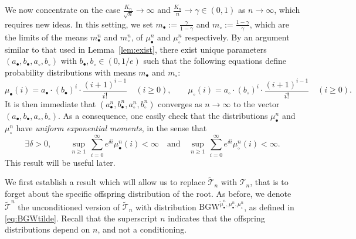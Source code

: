\documentclass[10pt]{amsart}
\theoremstyle{definition}\newtheorem{defi}[theo]{Definition}\newtheorem{rema}[theo]{Remark}\newtheorem{exam}[theo]{Example}\newtheorem{exem}[theo]{Example}\newtheorem{nota}[theo]{Notation}
\def\ab{a_{\bullet}}
\def\ac{a_{\circ}}
\def\bb{b_{\bullet}}
\def\bc{b_{\circ}}
\def\abn{a_{\bullet}^{n}}
\def\acn{a_{\circ}^{n}}
\def\bbn{b_{\bullet}^{n}}
\def\bcn{b_{\circ}^{n}}
\def\mub{\mu_{\bullet}}
\def\muc{\mu_{\circ}}
\def\mubn{\mu_{\bullet}^{n}}
\def\mucn{\mu_{\circ}^{n}}
\def\tTs{\tilde{\Ts}}
\newcommand\BGW{\textrm{BGW}}
\def\Ts{\mathscr{T}}
\begin{document}
We now concentrate on the case  $\tfrac{K_{n}}{\sqrt{n}} \rightarrow \infty$ and $ \tfrac{K_{n}}{n}  \rightarrow \gamma \in (0,1)$ as $n \rightarrow \infty$, which requires new ideas.
In this setting, we set $m_\bullet:=\frac{\gamma}{1-\gamma}$ and $m_\circ:=\frac{1-\gamma}{\gamma}$,
which are the limits of the means $m_\bullet^n$ and $m_\circ^n$, of $\mubn$ and $\mucn$ respectively.
By an argument similar to that used in Lemma~\ref{lem:exist}, there exist unique parameters $(\ab,\bb,\ac,\bc)$ with $\bb,\bc \in (0,1/e)$
such that the following equations define probability distributions with means $m_\bullet$ and $m_\circ$:
 \begin{equation}
 \label{eq:mubc}\mub(i)= \ab \cdot  (\bb)^{i} \cdot \frac{(i+1)^{i-1}}{i!}  \quad (i \geq 0), \qquad \muc(i)= \ac \cdot  (\bc)^{i} \cdot \frac{(i+1)^{i-1}}{i!}  \quad (i \geq 0).
 \end{equation}
 It is then immediate that $(\abn,\bbn,\acn,\bcn)$ converges as $n \rightarrow \infty$ to the vector $(\ab,\bb,\ac,\bc)$.
 As a consequence, one easily check that the distributions $\mubn$ and $\mucn$
 have {\em uniform exponential moments}, in the sense that
 \begin{equation}
   \label{eq:expmoment} \exists \delta>0,\,  \qquad  \sup_{n \ge 1} \, \sum_{i=0}^{\infty} e^{\delta i} \mubn(i) < \infty
   \quad \textrm{and} \quad \sup_{n \ge 1}\, \sum_{i=0}^{\infty} e^{\delta i} \mucn(i) < \infty.
 \end{equation}
 This result will be useful later.

We first establish a result which will allow us to replace $\tTs_{n}$ with $\Ts_{n}$,
that is to forget about the specific offspring distribution of the root.
As before, we denote $\tilde{\Ts} ^{n}$ the unconditioned version of $\tTs_n$
with distribution ${\BGW}^{\widetilde{\mu}_{\bullet}^{n},\mubn,\mucn}$, as defined in \eqref{eq:BGWtilde}.
Recall that the superscript $n$ indicates that the offspring distributions depend on $n$, and not a conditioning.
\end{document}
